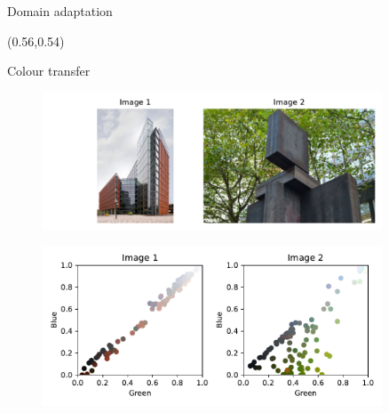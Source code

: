 \documentclass[pdf,aspectratio=169,10pt]{beamer}
\begin{document}
\begin{frame}{ Domain adaptation}
\begin{textblock}{0.45}(0.56,0.54)
\small
{}
\end{textblock}
\end{frame}




\begin{frame}[plain]{ Colour transfer}
\begin{minipage}{0.4\textwidth}
\vspace{-2em}
    \begin{figure}
        \includegraphics[width=0.9\textwidth]{../img/ex1_original_images.pdf}
    \end{figure}
\vspace{-1em}
    \begin{figure}
        \includegraphics[width=0.9\textwidth]{../img/ex1_colour_histograms.pdf}
    \end{figure}
    

\end{minipage}
\end{frame}
\end{document}
